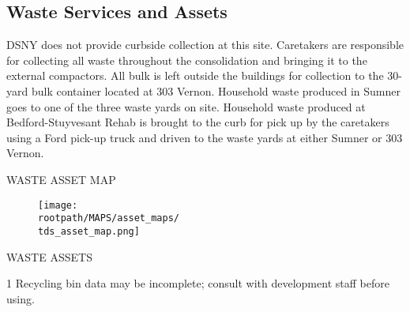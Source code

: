 \pagebreak
\restoregeometry
\textcolor{ccorange}{\section{Waste Services and Assets}}
DSNY does not provide curbside collection at this site. Caretakers are responsible for collecting all
waste throughout the consolidation and bringing it to the external compactors. All bulk is left outside the
buildings for collection to the 30-yard bulk container located at 303 Vernon. Household waste produced
in Sumner goes to one of the three waste yards on site. Household waste produced at
Bedford-Stuyvesant Rehab is brought to the curb for pick up by the caretakers using a Ford pick-up
truck and driven to the waste yards at either Sumner or 303 Vernon.
\begin{table}[H]
\small
\small

\bigskip

\end{table}
\pagebreak

\textcolor{ccorange}{WASTE ASSET MAP}
\begin{figure}[H]
\raggedright
\texttt{[image: \\rootpath/MAPS/asset\_maps/\\tds\_asset\_map.png]}
\end{figure}
\pagebreak

\textcolor{ccorange}{WASTE ASSETS}

\begin{table}[H]
\begin{threeparttable}
\small



\begin{tablenotes}
\item [1] Recycling bin data may be incomplete; consult with development staff before using.
\end{tablenotes}
\end{threeparttable}
\end{table}

